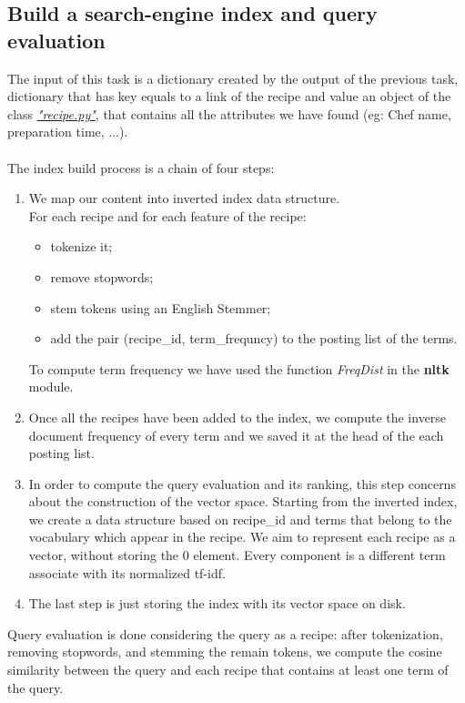 \documentclass[oneside]{article}			%
\begin{document}
	\clearpage
	\subsection{Build a search-engine index and query evaluation}
	The input of this task is a dictionary created by the output of the previous task, dictionary that has key equals to a link of the recipe and value an object of the class \href{run:./report_file/src/recipe.py}{\textit{"recipe.py"}}, that contains all the attributes we have found (eg: Chef name, preparation time, ...).
	\\\\
	The index build process is a chain of four steps:
	\begin{enumerate}[label=\arabic*.]
		\item We map our content into inverted index data structure.
		\\For each recipe and for each feature of the recipe:
		\begin{itemize}
			\item tokenize it;
			\item remove stopwords;
			\item stem tokens using an English Stemmer;
			\item add the pair (recipe\_id, term\_frequncy) to the posting list of the terms.
		\end{itemize}

		To compute term frequency we have used the function \textit{FreqDist} in the \textbf{nltk} module.
		\item Once all the recipes have been added to the index, we compute the inverse document frequency of every term and we saved it at the head of the each posting list.
		\item In order to compute the query evaluation and its ranking, this step concerns about the construction of the vector space. Starting from the inverted index, we create a data structure based on recipe\_id and terms that belong to the vocabulary which appear in the recipe. We aim to represent each recipe as a vector, without storing the 0 element. Every component is a different term associate with its normalized tf-idf.
		\item The last step is just storing the index with its vector space on disk.
	\end{enumerate}
	Query evaluation is done considering the query as a recipe: after tokenization, removing stopwords, and stemming the remain tokens, we compute the cosine similarity between the query and each recipe that contains at least one term of the query.
\end{document}
